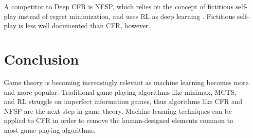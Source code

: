 \documentclass[11pt, oneside]{article}
\begin{document}
A competitor to Deep CFR is NFSP, which relies on the concept of fictitious
self-play instead of regret minimization, and uses RL as deep learning \cite{DBLP:journals/corr/HeinrichS16}.
Fictitious self-play is less well documented than CFR, however.

\section{Conclusion}

Game theory is becoming increasingly relevant as machine learning
becomes more and more popular. Traditional game-playing algorithms
like minimax, MCTS, and RL struggle on imperfect information games,
thus algorithms like CFR and NFSP are the next step
in game theory. Machine learning techniques can be applied to
CFR in order to remove the human-designed elements common
to most game-playing algorithms.

\newpage
\printbibliography
\end{document}

